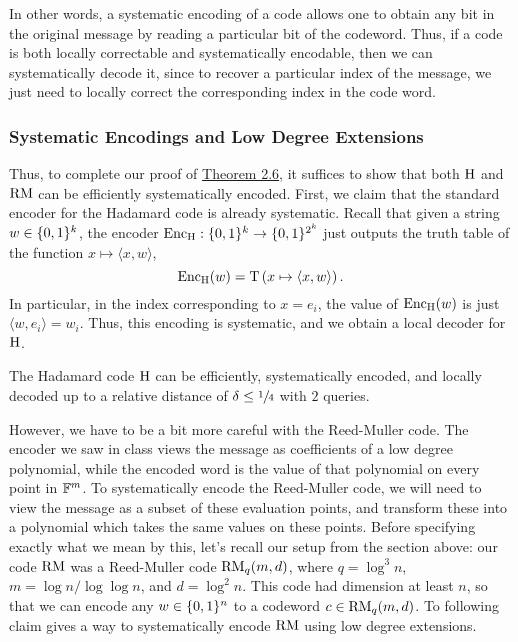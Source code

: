\documentclass[11pt]{article}
\begin{document}
In other words, a systematic encoding of a code allows one to obtain any bit in the original message by reading a particular bit of the codeword. Thus, if a code is both locally correctable and systematically encodable, then we can systematically decode it, since to recover a particular index of the message, we just need to locally correct the corresponding index in the code word. 

\subsubsection{Systematic Encodings and Low Degree Extensions}

Thus, to complete our proof of \hyperref[t-2-6]{Theorem 2.6}, it suffices to show that both $\mathrm{H}$ and $\mathrm{RM}$ can be efficiently systematically encoded. First, we claim that the standard encoder for the Hadamard code is already systematic. Recall that given a string $w \in \{0, 1\}^k$, the encoder $\mathrm{Enc}_{\mathrm{H}} : \{0, 1\}^k \rightarrow \{0, 1\}^{2^k}$ just outputs the truth table of the function $x \mapsto \langle x, w \rangle$,
\begin{equation*}
    \mathrm{Enc}_{\mathrm{H}} (w) = \mathrm{T}\left(x \mapsto \langle x, w \rangle\right).
\end{equation*}
In particular, in the index corresponding to $x = e_i$, the value of $\mathrm{Enc}_{\mathrm{H}}(w)$ is just $\langle w, e_i \rangle = w_i$. Thus, this encoding is systematic, and we obtain a local decoder for $\mathrm{H}$.

\begin{claim}{2.4}
    The Hadamard code $\mathrm{H}$ can be efficiently, systematically encoded, and locally decoded up to a relative distance of $\delta \leq \sfrac{1}{4}$ with $2$ queries.
\end{claim}

However, we have to be a bit more careful with the Reed-Muller code. The encoder we saw in class views the message as coefficients of a low degree polynomial, while the encoded word is the value of that polynomial on every point in $\mathbb{F}^m$. To systematically encode the Reed-Muller code, we will need to view the message as a subset of these evaluation points, and transform these into a polynomial which takes the same values on these points. Before specifying exactly what we mean by this, let's recall our setup from the section above: our code $\mathrm{RM}$ was a Reed-Muller code $\mathrm{RM}_q(m, d)$, where $q = \log^3 n$, $m = \log n / \log \log n$, and $d = \log^2 n$. This code had dimension at least $n$, so that we can encode any $w \in \{0, 1\}^n$ to a codeword $c \in \mathrm{RM}_q(m, d)$. To following claim gives a way to systematically encode $\mathrm{RM}$ using low degree extensions.
\end{document}
